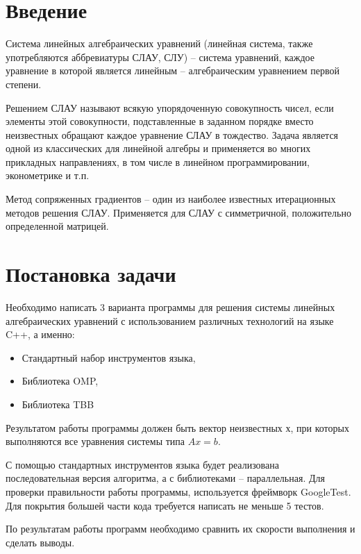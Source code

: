 \documentclass[14pt, russian]{extarticle}
\begin{document}
        \section{Введение}        
        Система линейных алгебраических уравнений (линейная система, также употребляются аббревиатуры СЛАУ, СЛУ) – система уравнений, каждое уравнение в которой является линейным – алгебраическим уравнением первой степени. 
        \par
        Решением СЛАУ называют всякую упорядоченную совокупность чисел, если элементы этой совокупности, подставленные в заданном порядке вместо неизвестных обращают каждое уравнение СЛАУ в тождество.
        Задача является одной из классических для линейной алгебры и применяется во многих прикладных направлениях, в том числе в линейном программировании, эконометрике и т.п.
        \par 
        Метод сопряженных градиентов – один из наиболее известных итерационных методов решения СЛАУ. Применяется для СЛАУ с симметричной, положительно определенной матрицей.

        \newpage

        \section{Постановка задачи}
        Необходимо написать 3 варианта программы для решения системы линейных алгебраических уравнений с использованием различных технологий на языке C++, а именно:
        \begin{itemize}
            \item Стандартный набор инструментов языка,
            \item Библиотека OMP,
            \item Библиотека TBB
        \end{itemize}
        \par
        Результатом работы программы должен быть вектор неизвестных $х$, при которых выполняются все уравнения системы типа $Ax = b$.
        \par 
        С помощью стандартных инструментов языка будет реализована последовательная версия алгоритма, а с библиотеками – параллельная. Для проверки правильности работы программы, используется фреймворк GoogleTest. Для покрытия большей части кода требуется написать не меньше 5 тестов.
        \par 
        По результатам работы программ необходимо сравнить их скорости выполнения и сделать выводы.
\end{document}
